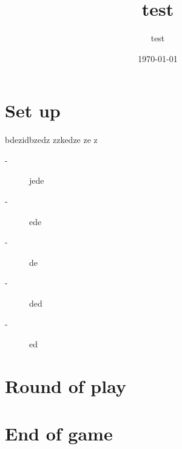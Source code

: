 \documentclass{article}%
\title{test}%
\author{test}%
\date{\today}%
\begin{document}
%
\pagestyle{empty}%
\normalsize%
\maketitle%
\section{ Set up
}%
\label{sec:Setup}%
bdezidbzedz zzkedze ze z
%
\begin{description}%
\item[{-} ]%
%
 jede
%
\item[{-} ]%
%
 ede
%
\item[{-} ]%
%
 de
%
\item[{-} ]%
%
 ded
%
\item[{-} ]%
%
 ed
%
\end{description}

%
\section{ Round of play
}%
\label{sec:Roundofplay}%

%
\section{ End of game}%
\label{sec:Endofgame}%

%
\end{document}

